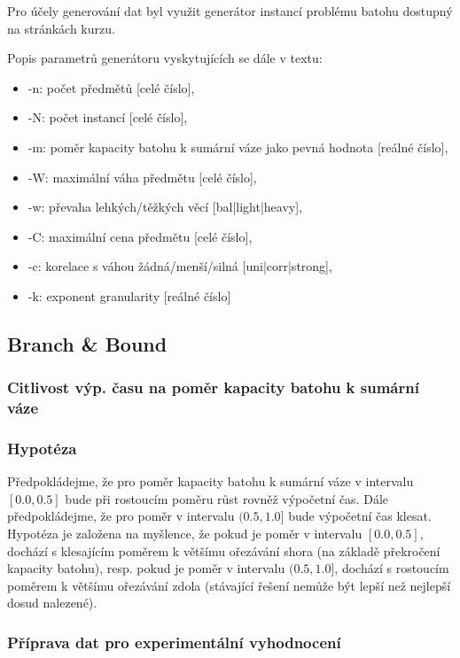 \documentclass[12pt]{article}
\begin{document}
Pro účely generování dat byl využit generátor instancí problému batohu dostupný na stránkách kurzu.

Popis parametrů generátoru vyskytujících se dále v textu:
\begin{itemize}
    \item -n: počet předmětů [celé číslo],
    \item -N: počet instancí [celé číslo],
    \item -m: poměr kapacity batohu k sumární váze jako pevná hodnota [reálné číslo],
    \item -W: maximální váha předmětu [celé číslo],
    \item -w: převaha lehkých/těžkých věcí [bal|light|heavy],
    \item -C: maximální cena předmětu [celé číslo],
    \item -c: korelace s váhou žádná/menší/silná [uni|corr|strong],
    \item -k: exponent granularity [reálné číslo]
\end{itemize}

\subsection{Branch \& Bound}

\subsubsection{Citlivost výp. času na poměr kapacity batohu k sumární váze}

\subsubsection*{Hypotéza} \label{section:bnb_hyp}

Předpokládejme, že pro poměr kapacity batohu k sumární váze v intervalu $[0.0, 0.5]$ bude při rostoucím poměru růst rovněž výpočetní čas. Dále předpokládejme, že pro poměr v intervalu $(0.5, 1.0]$ bude výpočetní čas klesat. Hypotéza je založena na myšlence, že pokud je poměr v intervalu $[0.0, 0.5]$, dochází s klesajícím poměrem k většímu ořezávání shora (na základě překročení kapacity batohu), resp. pokud je poměr v intervalu $(0.5, 1.0]$, dochází s rostoucím poměrem k většímu ořezávání zdola (stávající řešení nemůže být lepší než nejlepší dosud nalezené).

\subsubsection*{Příprava dat pro experimentální vyhodnocení}
\end{document}
